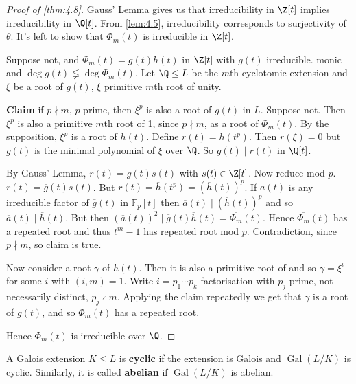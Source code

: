 \documentclass{article}
\DeclareMathOperator{\Gal}{Gal}
\newcommand{\F}{\mathbb{F}}
\begin{document}
\begin{proof}[Proof of \cref{thm:4.8}]
    Gauss' Lemma gives us that irreducibility in $\Z[t]$ implies irreducibility in $\Q[t]$.
    From \cref{lem:4.5}, irreducibility corresponds to surjectivity of $\theta$.
    It's left to show that $\Phi_m(t)$ is irreducible in $\Z[t]$.

    Suppose not, and $\Phi_m(t) = g(t) h(t)$ in $\Z[t]$ with $g(t)$ irreducible. monic and $\deg g(t) \lneqq \deg \Phi_m(t)$.
    Let $\Q \leq L$ be the $m$th cyclotomic extension and $\xi$ be a root of $g(t)$, $\xi$ primitive $m$th root of unity.

    \textbf{Claim} if $p \nmid m$, $p$ prime, then $\xi^p$ is also a root of $g(t)$ in $L$.
    Suppose not. Then $\xi^p$ is also a primitive $m$th root of 1, since $p \nmid m$, as a root of $\Phi_m(t)$.
    By the supposition, $\xi^p$ is a root of $h(t)$.
    Define $r(t) = h(t^p)$. Then $r(\xi) = 0$ but $g(t)$ is the minimal polynomial of $\xi$ over $\Q$.
    So $g(t) \mid r(t)$ in $\Q[t]$.

    By Gauss' Lemma, $r(t) = g(t) s(t)$ with $s(t) \in \Z[t]$.
    Now reduce mod $p$. $\overline{r}(t) = \overline{g}(t) \overline{s}(t)$.
    But $\overline{r}(t) = \overline{h}(t^p) = (\overline{h}(t))^p$.
    If $\overline{a}(t)$ is any irreducible factor of $\overline{g}(t)$ in $\F_p[t]$ then $\overline{a}(t) \mid (\overline{h}(t))^p$ and so $\overline{a}(t) \mid \overline{h}(t)$.
    But then $(\overline{a}(t))^2 \mid \overline{g}(t) \overline{h}(t) = \overline{\Phi_m}(t)$.
    Hence $\overline{\Phi_m}(t)$ has a repeated root and thus $t^m-1$ has repeated root mod $p$.
    Contradiction, since $p \nmid m$, so claim is true.

    Now consider a root $\gamma$ of $h(t)$.
    Then it is also a primitive root of %
    and so $\gamma = \xi^i$ for some $i$ with $(i, m) = 1$.
    Write $i = p_1 \dotsm p_k$ factorisation with $p_j$ prime, not necessarily distinct, $p_j \nmid m$.
    Applying the claim repeatedly we get that $\gamma$ is a root of $g(t)$, and so $\Phi_m(t)$ has a repeated root.

    Hence $\Phi_m(t)$ is irreducible over $\Q$.
\end{proof}

\begin{ndef}\label{def:4.9}
    A Galois extension $K \leq L$ is \textbf{cyclic} if the extension is Galois and $\Gal(L/K)$ is cyclic.
    Similarly, it is called \textbf{abelian} if $\Gal(L/K)$ is abelian.
\end{ndef}
\end{document}
